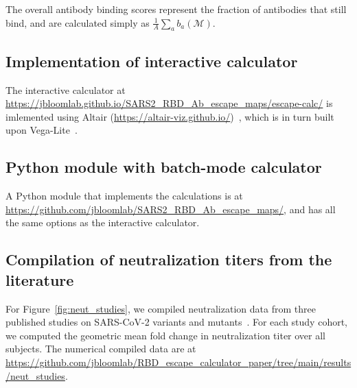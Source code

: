 \documentclass[9pt,twocolumn,twoside]{gsajnl_modified}
\begin{document}
{The overall antibody binding scores represent the fraction of antibodies that still bind, and are calculated simply as $\frac{1}{A}\sum_a b_a\left(\mathcal{M}\right)$.

\subsection{Implementation of interactive calculator}
The interactive calculator at \url{https://jbloomlab.github.io/SARS2_RBD_Ab_escape_maps/escape-calc/} is imlemented using Altair (\url{https://altair-viz.github.io/})~\citep{VanderPlas2018}, which is in turn built upon Vega-Lite~\citep{Satyanarayan2017}.

\subsection{Python module with batch-mode calculator}
A Python module that implements the calculations is at \url{https://github.com/jbloomlab/SARS2_RBD_Ab_escape_maps/}, and has all the same options as the interactive calculator.

\subsection{Compilation of neutralization titers from the literature}
For Figure~\ref{fig:neut_studies}, we compiled neutralization data from three published studies on SARS-CoV-2 variants and mutants~\citep{lucas2021impact,uriu2021neutralization,wang2021antibody}.
For each study cohort, we computed the geometric mean fold change in neutralization titer over all subjects.
The numerical compiled data are at \url{https://github.com/jbloomlab/RBD_escape_calculator_paper/tree/main/results/neut_studies}.

}
\end{document}
